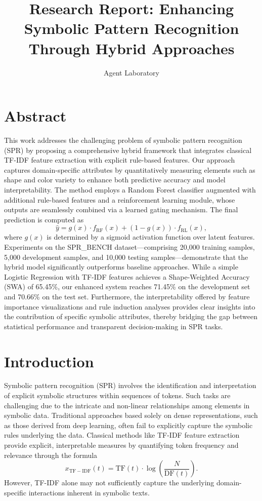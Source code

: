 \documentclass{article}
\title{Research Report: Enhancing Symbolic Pattern Recognition Through Hybrid Approaches}
\author{Agent Laboratory}
\date{}
\begin{document}
\maketitle

\section{Abstract}
This work addresses the challenging problem of symbolic pattern recognition (SPR) by proposing a comprehensive hybrid framework that integrates classical TF-IDF feature extraction with explicit rule-based features. Our approach captures domain-specific attributes by quantitatively measuring elements such as shape and color variety to enhance both predictive accuracy and model interpretability. The method employs a Random Forest classifier augmented with additional rule-based features and a reinforcement learning module, whose outputs are seamlessly combined via a learned gating mechanism. The final prediction is computed as 
\[
\hat{y} = g(x) \cdot f_{\mathrm{RF}}(x) + (1-g(x)) \cdot f_{\mathrm{RL}}(x),
\]
where \(g(x)\) is determined by a sigmoid activation function over latent features. Experiments on the SPR\_BENCH dataset—comprising 20,000 training samples, 5,000 development samples, and 10,000 testing samples—demonstrate that the hybrid model significantly outperforms baseline approaches. While a simple Logistic Regression with TF-IDF features achieves a Shape-Weighted Accuracy (SWA) of 65.45\%, our enhanced system reaches 71.45\% on the development set and 70.66\% on the test set. Furthermore, the interpretability offered by feature importance visualizations and rule induction analyses provides clear insights into the contribution of specific symbolic attributes, thereby bridging the gap between statistical performance and transparent decision-making in SPR tasks.

\section{Introduction}
Symbolic pattern recognition (SPR) involves the identification and interpretation of explicit symbolic structures within sequences of tokens. Such tasks are challenging due to the intricate and non-linear relationships among elements in symbolic data. Traditional approaches based solely on dense representations, such as those derived from deep learning, often fail to explicitly capture the symbolic rules underlying the data. Classical methods like TF-IDF feature extraction provide explicit, interpretable measures by quantifying token frequency and relevance through the formula 
\[
x_{\mathrm{TF-IDF}}(t) = \mathrm{TF}(t) \cdot \log\left(\frac{N}{\mathrm{DF}(t)}\right).
\]
However, TF-IDF alone may not sufficiently capture the underlying domain-specific interactions inherent in symbolic texts.
\end{document}
